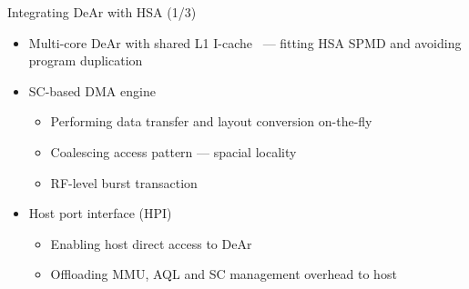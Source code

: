 \documentclass{beamer}
\begin{document}
\begin{CJK}{UTF8}{bkai}
            \begin{frame}{Integrating DeAr with HSA (1/3)}
                \begin{itemize}
                    \item <2-> {Multi-core DeAr with shared L1 I-cache~ --- fitting HSA SPMD and avoiding program duplication}
                    \item <3-> {SC-based DMA engine~
                            \begin{itemize}
                                \item Performing data transfer and layout conversion on-the-fly
                                \item Coalescing access pattern --- spacial locality
                                \item RF-level burst transaction
                            \end{itemize}
                        }
                    \item <4-> {Host port interface (HPI)~
                            \begin{itemize}
                                \item Enabling host direct access to DeAr
                                \item Offloading MMU, AQL and SC management overhead to host
                            \end{itemize}
                        }
                \end{itemize}
            \end{frame}


\end{CJK}
\end{document}
